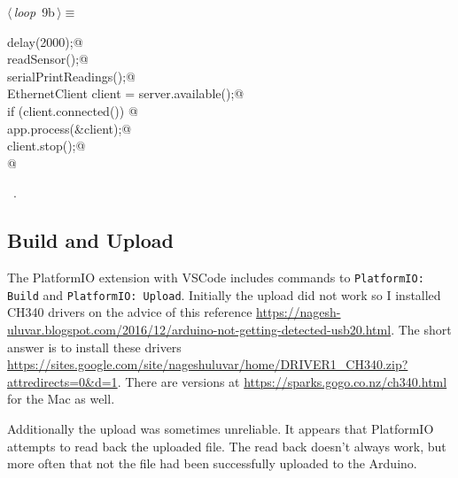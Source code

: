 \documentclass[a4paper, 11pt]{article}
\begin{document}
\begin{flushleft} \small
\begin{minipage}{\linewidth}\label{scrap13}\raggedright\small
{}$\langle\,${\itshape loop}\nobreak\ {\footnotesize{9b}}$\,\rangle\equiv$
\vspace{-1ex}
\begin{list}{}{\setlength{\leftmargin}{1em}} \item
\mbox{}\lstinline@  delay(2000);@\\
\mbox{}\lstinline@  readSensor();@\\
\mbox{}\lstinline@  serialPrintReadings();@\\
\mbox{}\lstinline@  EthernetClient client = server.available();@\\
\mbox{}\lstinline@  if (client.connected()) {@\\
\mbox{}\lstinline@    app.process(&client);@\\
\mbox{}\lstinline@    client.stop();@\\
\mbox{}\lstinline@  }@\\
\mbox{}{\NWsep}
\end{list}
\vspace{-1ex}
\vspace{-1ex}
\footnotesize
\begin{list}{}{\setlength{\itemsep}{-\parsep}\setlength{\itemindent}{-\leftmargin}}
\item \NWtxtMacroRefIn\ .
\end{list}
\end{minipage}
\end{flushleft}

\subsection{Build and Upload}

The PlatformIO extension with VSCode includes
commands to 
\verb|PlatformIO: Build|
and
\verb|PlatformIO: Upload|.
Initially the upload did not work so I installed CH340 drivers
on the advice of this reference \url{https://nagesh-uluvar.blogspot.com/2016/12/arduino-not-getting-detected-usb20.html}.
The short answer is to install these drivers \url{https://sites.google.com/site/nageshuluvar/home/DRIVER1_CH340.zip?attredirects=0&d=1}.
There are versions at \url{https://sparks.gogo.co.nz/ch340.html} for the Mac as well.

Additionally the upload was sometimes unreliable.
It appears that PlatformIO attempts to read back the uploaded file.
The read back doesn't always work,
but more often that not the file had been successfully uploaded to the Arduino.
\end{document}
